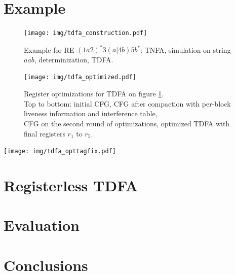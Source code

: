 \documentclass[]{article}
\begin{document}
\section{Example}\label{section_example}

\begin{figure}%
\texttt{[image: img/tdfa\_construction.pdf]}
\vspace{0.1em}
\caption{
Example for RE $(1a2)^*3(a|4b)5b^*$: TNFA, simulation on string $aab$, determinization, TDFA.
}\label{fig:tdfa_construction}
\end{figure}

\FloatBarrier

\begin{figure}[h!]
\texttt{[image: img/tdfa\_optimized.pdf]}
\vspace{0.5em}
\caption{
Register optimizations for TDFA on figure \ref{fig:tdfa_construction}. \\
Top to bottom: initial CFG,
CFG after compaction with per-block liveness information and interference table,\\
CFG on the second round of optimizations,
optimized TDFA with final registers $r_1$ to $r_5$.
}\label{fig:tdfa_regopt}
\end{figure}

\FloatBarrier

\texttt{[image: img/tdfa\_opttagfix.pdf]}
\vspace{0.5em}
\label{fig:tdfa_fixopt}

\FloatBarrier

\section{Registerless TDFA}\label{subsection_regless}

\section{Evaluation}\label{section_evaluation}

\section{Conclusions}\label{section_conclusions}
\end{document}

